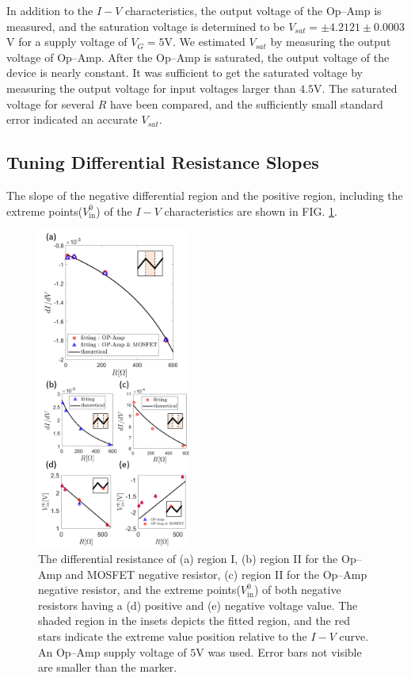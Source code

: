 \documentclass[%
 aip,
amsmath,amssymb,
reprint,
]{revtex4-1}
\begin{document}
In addition to the $I-V$ characteristics, the output voltage of the Op--Amp is measured, and the saturation voltage is determined to be $V_{sat} = \pm 4.2121 \pm 0.0003 $V for a supply voltage of $V_G = 5$V. We estimated $V_{sat}$ by measuring the output voltage of Op--Amp. After the Op--Amp is saturated, the output voltage of the device is nearly constant. It was sufficient to get the saturated voltage by measuring the output voltage for input voltages larger than $4.5$V. The saturated voltage for several $R$ have been compared, and the sufficiently small standard error indicated an accurate $V_{sat}$.




\subsection{Tuning Differential Resistance Slopes}
The slope of the negative differential region and the positive region, including the extreme points($V_\text{in}^0$) of the $I-V$ characteristics are shown in FIG. \ref{fig:Fig2}.

\begin{figure}[!h]
  \includegraphics[width=0.45\textwidth]{figures/Fig2.png}
  \caption{The differential resistance of (a) region I, (b) region II for the Op--Amp and MOSFET negative resistor, (c) region II for the Op--Amp negative resistor, and the extreme points($V_\text{in}^{0}$) of both negative resistors having a (d) positive and (e) negative voltage value. The shaded region in the insets depicts the fitted region, and the red stars indicate the extreme value position relative to the $I-V$ curve. An Op--Amp supply voltage of $5$V was used. Error bars not visible are smaller than the marker.}
  \label{fig:Fig2}
\end{figure}
\end{document}
